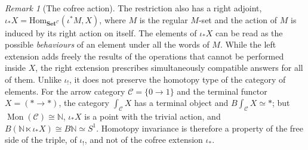 \documentclass[11pt]{amsart}
\theoremstyle{definition}
\theoremstyle{remark}
\newtheorem{remark}[teo]{Remark}
\numberwithin{figure}{section}%
\newcommand{\CC}{\mathcal{C}}
\DeclareMathOperator{\Mon}{Mon}
\newcommand{\Set}{\mathbf{Set}}
\newcommand{\Dinj}{\Delta_{\mathrm{inj}}}
\newcommand{\Hom}{\mathrm{Hom}}
\newcommand{\op}{\mathrm{op}}
\begin{document}

\begin{remark}[The cofree action]
\label{rem:cofree}
The restriction also has a right adjoint, $\iota_*X=\Hom_{\Set^{\CC}}(\iota^*M,X)$, where $M$ is the regular $M$-set and the action of $M$ is induced by its right action on itself. The elements of $\iota_*X$ can be read as the possible \emph{behaviours} of an element under all the words of $M$. While the left extension adds freely the results of the operations that cannot be performed inside $X$, the right extension prescribes simultaneously compatible answers for all of them. Unlike $\iota_!$, it does not preserve the homotopy type of the category of elements. For the arrow category $\CC=\{0\to1\}$ and the terminal functor $X=(*\to*)$, the category $\int_{\CC}X$ has a terminal object and $B\!\int_{\CC}X\simeq*$; but $\Mon(\CC)\cong\mathbb N$, $\iota_*X$ is a point with the trivial action, and $B(\mathbb N\ltimes\iota_*X)\cong B\mathbb N\simeq S^1$. Homotopy invariance is therefore a property of the free side of the triple, of $\iota_!$, and not of the cofree extension $\iota_*$.
\end{remark}
\end{document}
